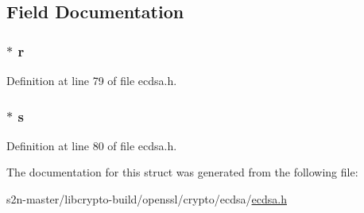 \subsection{Field Documentation}
\subsubsection[{\texorpdfstring{r}{r}}]{ $\ast$ r}\hypertarget{struct_e_c_d_s_a___s_i_g__st_a9e16dc92f95ba02ecb83b7cf0b345c78}{}\label{struct_e_c_d_s_a___s_i_g__st_a9e16dc92f95ba02ecb83b7cf0b345c78}


Definition at line 79 of file ecdsa.\+h.

\subsubsection[{\texorpdfstring{s}{s}}]{ $\ast$ s}\hypertarget{struct_e_c_d_s_a___s_i_g__st_a174fa2d60f08e563a4405911f6c81172}{}\label{struct_e_c_d_s_a___s_i_g__st_a174fa2d60f08e563a4405911f6c81172}


Definition at line 80 of file ecdsa.\+h.



The documentation for this struct was generated from the following file\+:\begin{DoxyCompactItemize}
\item 
s2n-\/master/libcrypto-\/build/openssl/crypto/ecdsa/\hyperlink{crypto_2ecdsa_2ecdsa_8h}{ecdsa.\+h}\end{DoxyCompactItemize}

